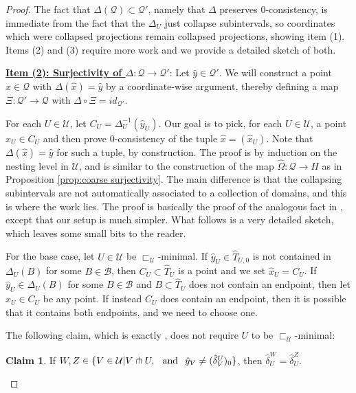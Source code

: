 \documentclass{amsart}
\theoremstyle{definition}
\newtheorem{claim}[theorem]{Claim}
\theoremstyle{remark}
\theoremstyle{definition}
\newcommand{\calB}{\mathcal{B}}
\newcommand{\calQ}{\mathcal{Q}}
\newcommand{\calU}{\mathcal{U}}
\newcommand{\hT}{\widehat{T}}
\newcommand{\hx}{\hat{x}}
\newcommand{\hy}{\hat{y}}
\newcommand{\hd}{\hat{\delta}}
\newcommand{\hO}{\widehat{\Omega}}
\newcommand{\nest}{\sqsubset}
\begin{document}
\begin{proof}
The fact that $\Delta(\calQ) \subset \calQ'$, namely that $\Delta$ preserves $0$-consistency, is immediate from the fact that the $\Delta_U$ just collapse subintervals, so coordinates which were collapsed projections remain collapsed projections, showing item (1).  Items (2) and (3) require more work and we provide a detailed sketch of both.
\medskip

\textbf{\underline{Item (2): Surjectivity of $\Delta:\calQ \to \calQ'$}}: Let $\hy \in \calQ'$.  We will construct a point $\hx \in \calQ$ with $\Delta(\hx) = \hy$ by a coordinate-wise argument, thereby defining a map $\Xi:\calQ' \to \calQ$ with $\Delta \circ \Xi = id_{\calQ'}$.

For each $U \in \calU$, let $C_U = \Delta^{-1}_U(\hy_U)$.  Our goal is to pick, for each $U \in \calU$, a point $\hx_U \in C_U$ and then prove $0$-consistency of the tuple $\hx = (\hx_U)$.  Note that $\Delta(\hx) =\hy$ for such a tuple, by construction.  The proof is by induction on the nesting level in $\calU$, and is similar to the construction of the map $\hO:\calQ \to H$ as in Proposition \ref{prop:coarse surjectivity}.  The main difference is that the collapsing subintervals are not automatically associated to a collection of domains, and this is where the work lies.  The proof is basically the proof of the analogous fact in \cite[Theorem 10.2]{Dur_infcube}, except that our setup is much simpler.  What follows is a very detailed sketch, which leaves some small bits to the reader.

For the base case, let $U \in \calU$ be $\nest_{\calU}$-minimal.   If $\hy_U \in \hT_{U,0}$ is not contained in $\Delta_U(B)$ for some $B \in \calB$, then $C_U\subset \hT_U$ is a point and we set $\hx_U = C_U$.  If $\hy_U \in \Delta_U(B)$ for some $B \in \calB$ and $B \subset \hT_U$ does not contain an endpoint, then let $\hx_U \in C_U$ be any point.  If instead $C_U$ does contain an endpoint, then it is possible that it contains both endpoints, and we need to choose one.

The following claim, which is exactly \cite[Claim 10.3]{Dur_infcube}, does not require $U$ to be $\nest_{\calU}$-minimal:

\begin{claim} \label{claim:choose one}
If $W, Z \in \{V \in \calU| V\pitchfork U, \hspace{.1in} \text{and} \hspace{.1in} \hy_V \neq (\hd^U_V)_0\}$, then $\hd^W_U = \hd^Z_U$.
\end{claim}


\end{proof}
\end{document}
